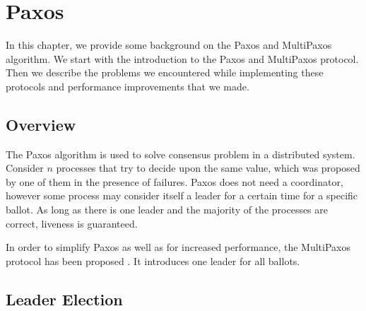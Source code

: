 \chapter{Paxos}

In this chapter, we provide some background on the Paxos and MultiPaxos algorithm. We start with the introduction to the Paxos and MultiPaxos protocol. Then we describe the problems we encountered while implementing these protocols and performance improvements that we made.

\section{Overview}
The Paxos algorithm is used to solve consensus problem in a distributed system. Consider $n$ processes that try to decide upon the same value, which was proposed by one of them in the presence of failures. Paxos does not need a coordinator, however some process may consider itself a leader for a certain time for a specific ballot. As long as there is one leader and the majority of the processes are correct, liveness is guaranteed.

In order to simplify Paxos as well as for increased performance, the MultiPaxos protocol has been proposed \cite{Lam01}. It introduces one leader for all ballots.









\section{Leader Election}
\label{sec:leader_election}
\indent\par

